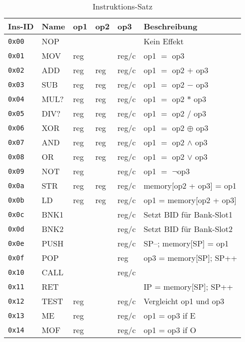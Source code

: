 \documentclass{scrartcl}
\begin{document}
\begin{center}
	\begin{table*}
		\caption{\label{table:instructions}Instruktions-Satz}
		\begin{tabular}{l | l l l l | l}
			Ins-ID & Name & op1 & op2 & op3 & Beschreibung \\
			\hline
			\texttt{0x00} & NOP  &  &  &  & Kein Effekt  \\
			\hline
			\texttt{0x01} & MOV  & reg &  & reg/c & op1 $=$ op3\\
			\texttt{0x02} & ADD  & reg & reg & reg/c & op1 $=$ op2 $+$ op3 \\
			\texttt{0x03} & SUB  & reg & reg & reg/c & op1 $=$ op2 $-$ op3 \\
			\texttt{0x04} & MUL? & reg & reg & reg/c & op1 $=$ op2 $*$ op3 \\
			\texttt{0x05} & DIV? & reg & reg & reg/c & op1 $=$ op2 $/$ op3 \\
			\texttt{0x06} & XOR  & reg & reg & reg/c & op1 $=$ op2 $\oplus$ op3 \\
			\texttt{0x07} & AND  & reg & reg & reg/c & op1 $=$ op2 $\land$ op3 \\
			\texttt{0x08} & OR   & reg & reg & reg/c & op1 $=$ op2 $\lor$ op3 \\
			\texttt{0x09} & NOT  & reg &  & reg/c & op1 $=$ $\lnot$op3 \\
			\hline 
			\texttt{0x0a} & STR  & reg & reg & reg/c & memory[op2 + op3] = op1  \\
			\texttt{0x0b} & LD   & reg & reg & reg/c & op1 = memory[op2 + op3] \\
			\texttt{0x0c} & BNK1 &  &  & reg/c & Setzt BID für Bank-Slot1 \\
			\texttt{0x0d} & BNK2 &  &  & reg/c & Setzt BID für Bank-Slot2 \\
			\hline
			\texttt{0x0e} & PUSH &  &  & reg/c & SP--; memory[SP] = op1 \\
			\texttt{0x0f} & POP  &  &  & reg & op3 = memory[SP]; SP++ \\
			\texttt{0x10} & CALL &  &  & reg/c & \vtop{
				\hbox{\strut memory[SP] = IP; SP++;}
				\hbox{\strut IP = op3}} \\
			\texttt{0x11} & RET  &  &  &  & IP = memory[SP]; SP++ \\
			\hline
			\texttt{0x12} & TEST & reg &  & reg/c & Vergleicht op1 und op3 \\
			\texttt{0x13} & ME   & reg &  & reg/c & op1 = op3 if E \\
			\texttt{0x14} & MOF  & reg &  & reg/c & op1 = op3 if O \\

\end{tabular}
\end{table*}
\end{center}
\end{document}
